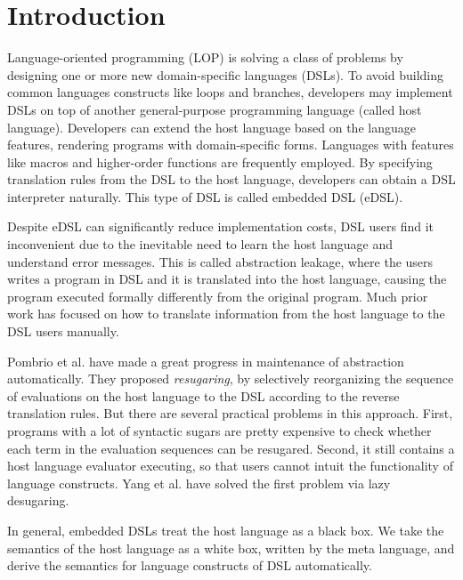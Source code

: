\section{Introduction}

Language-oriented programming (LOP)\cite{LOP} is solving a class of problems by designing one or more new domain-specific languages (DSLs).
To avoid building common languages constructs like loops and branches,
developers may implement DSLs on top of another general-purpose programming language (called host language).
Developers can extend the host language based on the language features, rendering programs with domain-specific forms.
Languages with features like macros and higher-order functions are frequently employed.
By specifying translation rules from the DSL to the host language, developers can obtain a DSL interpreter naturally.
This type of DSL is called embedded DSL (eDSL).

Despite eDSL can significantly reduce implementation costs, DSL users find it inconvenient due to the inevitable need to learn the host language and understand error messages.
This is called abstraction leakage, where the users writes a program in DSL and it is translated into the host language,
causing the program executed formally differently from the original program.
Much prior work has focused on how to translate information from the host language to the DSL users manually.

Pombrio et al. \cite{resugar} have made a great progress in maintenance of abstraction automatically.
They proposed \textit{resugaring}, by selectively reorganizing the sequence of evaluations on the host language to the DSL according to the reverse translation rules.
But there are several practical problems in this approach.
First, programs with a lot of syntactic sugars are pretty expensive to check whether each term in the evaluation sequences can be resugared.
Second, it still contains a host language evaluator executing,
so that users cannot intuit the functionality of language constructs.
Yang et al. \cite{lazy-desg} have solved the first problem via lazy desugaring.


In general, embedded DSLs treat the host language as a black box.
We take the semantics of the host language as a white box, written by the meta language,
and derive the semantics for language constructs of DSL automatically.

